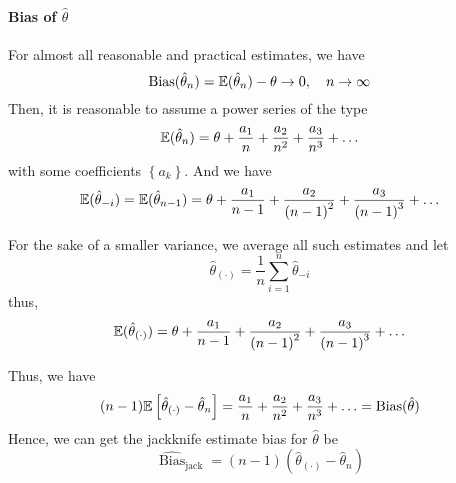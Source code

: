 \paragraph{Bias of $\hat{\theta}$}

For almost all reasonable and practical estimates, we have
\begin{equation*}
	\operatorname{Bias}(\hat{\theta}_{n})={\mathbb E}(\hat{\theta}_{n})-\theta\rightarrow 0,\quad n\rightarrow\infty
\end{equation*}
Then, it is reasonable to assume a power series of the type
\begin{equation*}
	{\mathbb E}(\hat{\theta}_{n})=\theta+\frac{a_{1}}{n}+\frac{a_{2}}{n^{2}}+\frac{a_{3}}{n^{3}}+\ldots
\end{equation*}
with some coefficients $\left\{a_{k}\right\}$. And we have
\begin{equation*}
	{\mathbb E}(\hat{\theta}_{-i})={\mathbb E}(\hat{\theta}_{n-1})=\theta+\frac{a_{1}}{n-1}+\frac{a_{2}}{\left(n-1\right)^{2}}+\frac{a_{3}}{\left(n-1\right)^{3}}+\ldots
\end{equation*}

For the sake of a smaller variance, we average all such estimates and let
\begin{equation*}
	\hat{\theta}_{(\cdot)}=\frac{1}{n}\sum_{i=1}^{n}\hat{\theta}_{-i}
\end{equation*}
thus,
\begin{equation*}
	{\mathbb E}(\hat{\theta}_{(\cdot)})=\theta+\frac{a_{1}}{n-1}+\frac{a_{2}}{\left(n-1\right)^{2}}+\frac{a_{3}}{\left(n-1\right)^{3}}+\ldots
\end{equation*}

Thus, we have
\begin{equation*}
	(n-1){\mathbb E}\left[\hat{\theta}_{(\cdot)}-\hat{\theta}_{n}\right]=\frac{a_{1}}{n}+\frac{a_{2}}{n^{2}}+\frac{a_{3}}{n^{3}}+\ldots=\operatorname{Bias}(\hat{\theta})
\end{equation*}
Hence, we can get the jackknife estimate bias for $\hat{\theta}$ be
\begin{equation}
	\widehat{\operatorname{Bias}}_{\text{jack}}=(n-1)\left(\hat{\theta}_{(\cdot)}-\hat{\theta}_{n}\right)
\end{equation}


